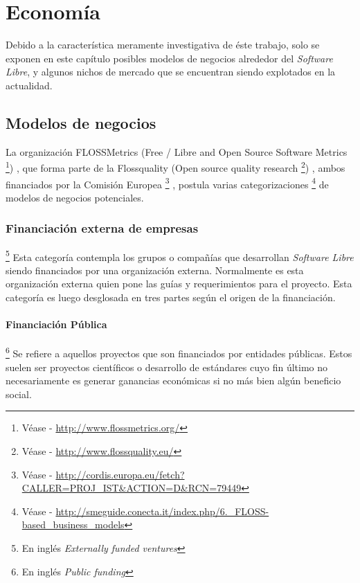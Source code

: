 \chapter{Econom\'ia}

Debido a la caracter\'istica meramente investigativa de \'este trabajo, solo
se exponen en este cap\'itulo posibles modelos de negocios alrededor del
\emph{Software Libre}, y algunos nichos de mercado que se encuentran siendo
explotados en la actualidad.\\

\section{Modelos de negocios}
La organizaci\'on FLOSSMetrics 
(Free / Libre and Open Source Software Metrics
\footnote{V\'ease - \url{http://www.flossmetrics.org/}})
, que forma parte de la Flossquality (Open source quality research
\footnote{V\'ease - \url{http://www.flossquality.eu/}})
, ambos financiados por la Comisi\'on Europea
\footnote{V\'ease -
\url{http://cordis.europa.eu/fetch?CALLER=PROJ_IST&ACTION=D&RCN=79449}}
, postula varias categorizaciones
\footnote{V\'ease -
\url{http://smeguide.conecta.it/index.php/6._FLOSS-based_business_models}} 
de modelos de negocios potenciales.


\subsection{Financiaci\'on externa de empresas}\footnote{En ingl\'es
\emph{Externally funded ventures}}
%
Esta categor\'ia contempla los grupos o compa\~n\'ias que desarrollan
\emph{Software Libre} siendo financiados por una organizaci\'on externa.
Normalmente es esta organizaci\'on externa quien pone las gu\'ias y
requerimientos para el proyecto. Esta categor\'ia es luego desglosada en tres
partes seg\'un el origen de la financiaci\'on.

\subsubsection{Financiaci\'on P\'ublica}\footnote{En ingl\'es \emph{Public
funding}}
%
Se refiere a aquellos proyectos que son financiados por entidades p\'ublicas.
Estos suelen ser proyectos cient\'ificos o desarrollo de est\'andares cuyo
fin
\'ultimo no necesariamente es generar ganancias econ\'omicas si no m\'as bien
alg\'un beneficio social.

